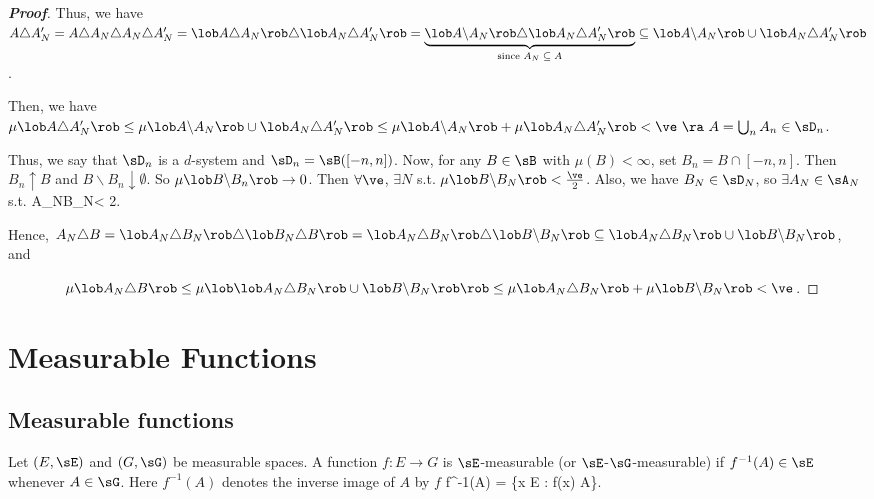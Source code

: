 \begin{proof}[\bf Proof]
Thus, we have $A\triangle A_N' = A\triangle A_N \triangle A_N\triangle A_N' = \lob A\triangle A_N \rob \triangle \lob A_N\triangle A_N'\rob = \underbrace{\lob A\backslash A_N \rob \triangle \lob A_N\triangle A_N'\rob }_{\text{since $A_N\subseteq A$}} \subseteq \lob A\backslash A_N \rob \cup \lob A_N\triangle A_N'\rob$.

Then, we have $\mu \lob A\triangle A_N'\rob \leq \mu \lob A\backslash A_N \rob \cup \lob A_N\triangle A_N'\rob \leq \mu\lob A\backslash A_N \rob + \mu\lob A_N\triangle A_N' \rob < \ve \ \ra \ A=\bigcup_n A_n \in \sD_n$.
\een

Thus, we say that $\sD_n$ is a $d$-system and $\sD_n=\sB([-n,n])$. Now, for any $B\in \sB$ with $\mu(B)<\infty$, set $B_n=B\cap[-n,n]$. Then $B_n\uparrow B$ and $B\backslash B_n\downarrow \emptyset$. So $\mu\lob B\backslash B_n\rob\to 0$. Then $\forall \ve$, $\exists N$ s.t. $\mu\lob B\backslash B_N\rob < \frac {\ve}2$. Also, we have $B_N\in \sD_N$, so $\exists A_N\in \sA_N$ s.t.
\be
\mu\lob A_N\triangle B_N\rob < \frac {\ve}2.
\ee

Hence, $A_N\triangle B = \lob A_N\triangle B_N\rob \triangle \lob B_N\triangle B\rob = \lob A_N\triangle B_N\rob \triangle \lob B\backslash B_N\rob\subseteq \lob A_N\triangle B_N\rob \cup \lob B\backslash B_N\rob$, and
\vspace{2mm}

$\quad\quad\quad\quad\mu\lob A_N\triangle B \rob \leq \mu\lob \lob A_N\triangle B_N\rob \cup \lob B\backslash B_N \rob\rob \leq \mu \lob A_N\triangle B_N \rob + \mu\lob B\backslash B_N\rob <\ve$.
\end{proof}




\section{Measurable Functions}

\subsection{Measurable functions}

\begin{definition}\label{def:measurable_function}
Let $(E, \sE)$ and $(G, \sG)$ be measurable spaces. A function $f : E \to G$ is $\sE$-measurable (or $\sE$-$\sG$-measurable) if $f^{-1}(A) \in\sE$ whenever $A \in \sG$. Here $f^{-1}(A)$ denotes the inverse image of $A$ by $f$
\be
f^{-1}(A) = \{x \in E : f(x) \in A\}.
\ee
\end{definition}

